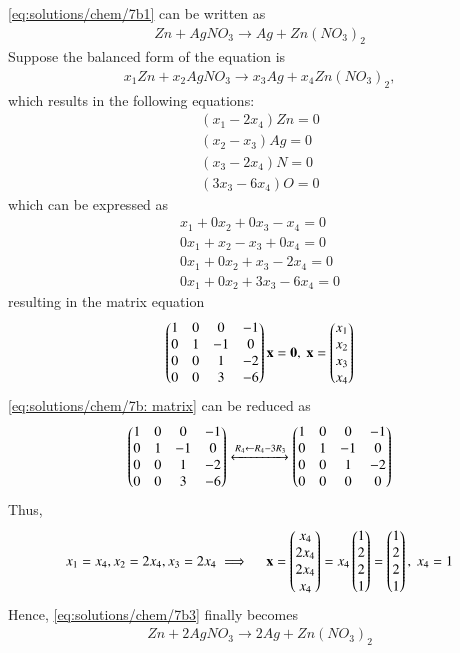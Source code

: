 \eqref{eq:solutions/chem/7b1}  can be written as 
\begin{align}
\label{eq:solutions/chem/7b2} Zn+ AgNO_{3} \to Ag + Zn(NO_{3})_{2}
\end{align}
Suppose the balanced form of the equation is 
\begin{align}
    \label{eq:solutions/chem/7b3} x_{1}Zn+ x_{2}AgNO_{3} \to x_{3}Ag + x_{4} Zn(NO_{3})_{2},
\end{align}
which results in the following equations:
\begin{align}
    ( x_{1} - 2x_{4} ) Zn = 0\\
    ( x_{2} - x_{3} ) Ag = 0\\
    ( x_{3} - 2 x_{4} ) N =0\\
    ( 3x_{3} - 6x_{4} ) O = 0
\end{align}
which can be expressed as
\begin{align}
    x_{1} + 0 x_{2} + 0 x_{3} - x_{4} = 0\\
    0 x_{1} + x_{2} - x_{3} + 0 x_{4} = 0\\
    0 x_{1} + 0 x_{2} + x_{3} - 2 x_{4} =0\\
    0 x_{1} + 0 x_{2} + 3x_{3} - 6 x_{4}= 0
\end{align}
resulting in the matrix equation
\begin{align}
    \label{eq:solutions/chem/7b: matrix}
    \begin{pmatrix}1 & 0 & 0 & -1\\
           0 & 1 & -1 & 0\\
           0 & 0 & 1 & -2\\
           0 & 0 & 3 & -6 \end{pmatrix}\mathbf{x}
           =\mathbf{0},\
   \mathbf{x}= \begin{pmatrix}x_{1}\\x_{2}\\x_{3}\\x_{4}\end{pmatrix}
\end{align}
\eqref{eq:solutions/chem/7b: matrix} can be reduced as
\begin{align}
    \begin{pmatrix}1 & 0 & 0 & -1\\
   	0 & 1 & -1 & 0\\
   	0 & 0 & 1 & -2\\
   	0 & 0 & 3 & -6 \end{pmatrix}
    \xleftrightarrow {R_{4}\leftarrow R_4 - 3R_3}
      \begin{pmatrix}1 & 0 & 0 & -1\\
    	0 & 1 & -1 & 0\\
    	0 & 0 & 1 & -2\\
    	0 & 0 & 0 & 0 \end{pmatrix}
    \end{align}
Thus,
\begin{align}
    x_1 = x_4, x_ 2 = 2x_4, x_3 = 2x_4
    \implies \quad\mathbf{x } = \begin{pmatrix}x_{4} \\ 2x_{4}\\ 2x_{4} \\ x_{4}\end{pmatrix}   =  x_4 \begin{pmatrix}1\\ 2 \\ 2 \\1\end{pmatrix} =
 \begin{pmatrix}1\\ 2 \\ 2 \\1\end{pmatrix},\
x_4= 1
    \end{align} 
Hence, \eqref{eq:solutions/chem/7b3} finally becomes
\begin{align}
Zn + 2AgNO_{3} \to 2Ag + Zn(NO_{3})_{2}
\end{align}
